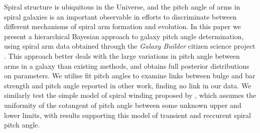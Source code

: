 Spiral structure is ubiquitous in the Universe, and the pitch angle of arms in spiral galaxies is an important observable in efforts to discriminate between different mechanisms of spiral arm formation and evolution. In this paper we present a hierarchical Bayesian approach to galaxy pitch angle determination, using spiral arm data obtained through the \textit{Galaxy Builder} citizen science project \citep{2020arXiv200610450L}. This approach better deals with the large variations in pitch angle between arms in a galaxy than existing methods, and obtains full posterior distributions on parameters. We utilise fit pitch angles to examine links between bulge and bar strength and pitch angle reported in other work, finding no link in our data. We similarly test the simple model of spiral winding proposed by \citet{2019arXiv190910291P}, which assumes the uniformity of the cotangent of pitch angle between some unknown upper and lower limits, with results supporting this model of transient and reccurent spiral pitch angle.
